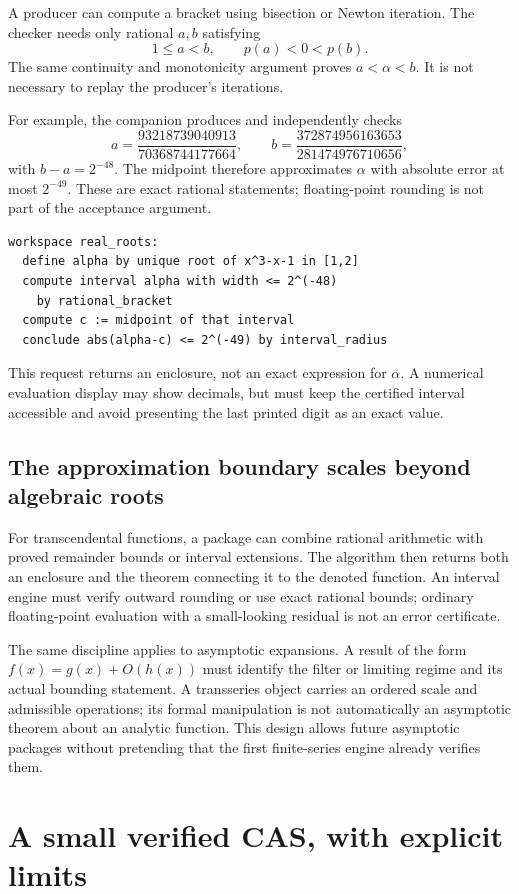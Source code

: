 \documentclass[11pt,letterpaper]{article}
\theoremstyle{definition}
\theoremstyle{remark}
\begin{document}
A producer can compute a bracket using bisection or Newton iteration. The
checker needs only rational $a,b$ satisfying
\[
 1\leq a<b,\qquad p(a)<0<p(b).
\]
The same continuity and monotonicity argument proves $a<\alpha<b$. It is not
necessary to replay the producer's iterations.

For example, the companion produces and independently checks
\[
 a=\frac{93218739040913}{70368744177664},\qquad
 b=\frac{372874956163653}{281474976710656},
\]
with $b-a=2^{-48}$. The midpoint therefore approximates $\alpha$ with absolute
error at most $2^{-49}$. These are exact rational statements; floating-point
rounding is not part of the acceptance argument.

\begin{lstlisting}
workspace real_roots:
  define alpha by unique root of x^3-x-1 in [1,2]
  compute interval alpha with width <= 2^(-48)
    by rational_bracket
  compute c := midpoint of that interval
  conclude abs(alpha-c) <= 2^(-49) by interval_radius
\end{lstlisting}
This request returns an enclosure, not an exact expression for $\alpha$.
A numerical evaluation display may show decimals, but must keep the certified
interval accessible and avoid presenting the last printed digit as an exact
value.

\subsection{The approximation boundary scales beyond algebraic roots}
For transcendental functions, a package can combine rational arithmetic with
proved remainder bounds or interval extensions. The algorithm then returns
both an enclosure and the theorem connecting it to the denoted function.
An interval engine must verify outward rounding or use exact rational bounds;
ordinary floating-point evaluation with a small-looking residual is not an
error certificate.

The same discipline applies to asymptotic expansions. A result of the form
$f(x)=g(x)+O(h(x))$ must identify the filter or limiting regime and its actual
bounding statement. A transseries object carries an ordered scale and
admissible operations; its formal manipulation is not automatically an
asymptotic theorem about an analytic function. This design allows future
asymptotic packages without pretending that the first finite-series engine
already verifies them.

\section{A small verified CAS, with explicit limits}
\label{sec:cas-library}
\end{document}
